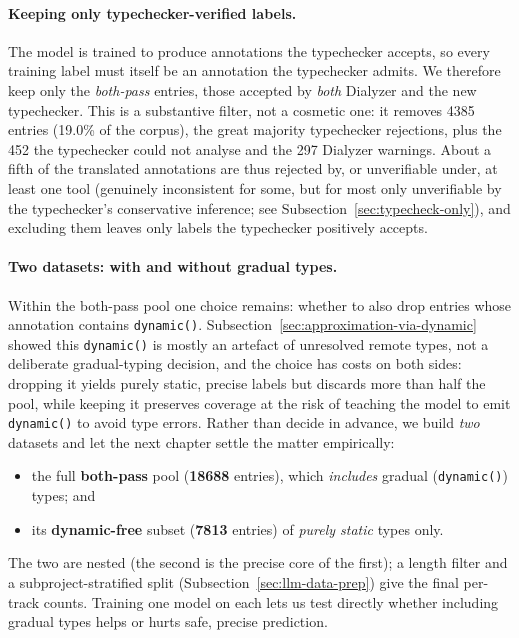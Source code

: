 \paragraph{Keeping only typechecker-verified labels.}
The model is trained to produce annotations the typechecker accepts, so every training label must itself be an annotation the typechecker admits.
We therefore keep only the \emph{both-pass} entries, those accepted by \emph{both} Dialyzer and the new typechecker.
This is a substantive filter, not a cosmetic one: it removes \num{4385} entries (19.0\% of the corpus), the great majority typechecker rejections, plus the 452 the typechecker could not analyse and the 297 Dialyzer warnings.
About a fifth of the translated annotations are thus rejected by, or unverifiable under, at least one tool (genuinely inconsistent for some, but for most only unverifiable by the typechecker's conservative inference; see Subsection~\ref{sec:typecheck-only}), and excluding them leaves only labels the typechecker positively accepts.

\paragraph{Two datasets: with and without gradual types.}
Within the both-pass pool one choice remains: whether to also drop entries whose annotation contains \texttt{dynamic()}.
Subsection~\ref{sec:approximation-via-dynamic} showed this \texttt{dynamic()} is mostly an artefact of unresolved remote types, not a deliberate gradual-typing decision, and the choice has costs on both sides: dropping it yields purely static, precise labels but discards more than half the pool, while keeping it preserves coverage at the risk of teaching the model to emit \texttt{dynamic()} to avoid type errors.
Rather than decide in advance, we build \emph{two} datasets and let the next chapter settle the matter empirically:
\begin{itemize}
  \item the full \textbf{both-pass} pool (\textbf{\num{18688}} entries), which \emph{includes} gradual (\texttt{dynamic()}) types; and
  \item its \textbf{dynamic-free} subset (\textbf{\num{7813}} entries) of \emph{purely static} types only.
\end{itemize}
The two are nested (the second is the precise core of the first); a length filter and a subproject-stratified split (Subsection~\ref{sec:llm-data-prep}) give the final per-track counts.
Training one model on each lets us test directly whether including gradual types helps or hurts safe, precise prediction.

